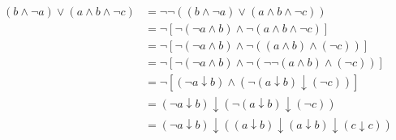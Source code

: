 \documentclass{gadsescript}
\begin{document}
\begin{enumerate}[label=\alph*)]
\begin{align*}
			(b \wedge \neg a ) \vee ( a \wedge b \wedge \neg c ) &= \neg \neg \left( ( b \wedge \neg a ) \vee ( a \wedge b \wedge \neg c ) \right)\\
			~&= \neg \left[ \neg ( \neg a \wedge b ) \wedge \neg ( a \wedge b \wedge \neg c ) \right]\\
			~&= \neg \left[ \neg ( \neg a \wedge b ) \wedge \neg ( (a \wedge b) \wedge (\neg c) ) \right]\\
			~&= \neg \left[ \neg ( \neg a \wedge b ) \wedge \neg ( \neg \neg (a \wedge b) \wedge (\neg c) )  \right]\\
			~&= \neg \left[ ( \neg a \downarrow b ) \wedge ( \neg (a \downarrow b) \downarrow (\neg c) )  \right]\\
			~&= ( \neg a \downarrow b ) \downarrow ( \neg (a \downarrow b) \downarrow (\neg c) ) \\
			~&= ( \neg a \downarrow b ) \downarrow ( (a \downarrow b) \downarrow (a \downarrow b) \downarrow (c\downarrow c) )
		\end{align*}

\end{enumerate}
\end{document}
